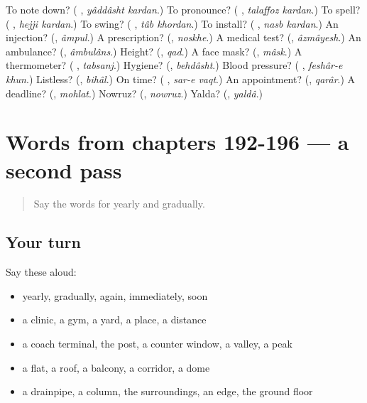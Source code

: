 \begin{tcolorbox}[breakable,colback=teal!4,colframe=teal!35!black,title={Before you move on}]
To note down? (\textbf{ }, \emph{yâddâsht kardan}.) To pronounce? (\textbf{ }, \emph{talaffoz kardan}.) To spell? (\textbf{ }, \emph{hejji kardan}.) To swing? (\textbf{ }, \emph{tâb khordan}.) To install? (\textbf{ }, \emph{nasb kardan}.) An injection? (\textbf{}, \emph{âmpul}.) A prescription? (\textbf{}, \emph{noskhe}.) A medical test? (\textbf{}, \emph{âzmâyesh}.) An ambulance? (\textbf{}, \emph{âmbulâns}.) Height? (\textbf{}, \emph{qad}.) A face mask? (\textbf{}, \emph{mâsk}.) A thermometer? (\textbf{ }, \emph{tabsanj}.) Hygiene? (\textbf{}, \emph{behdâsht}.) Blood pressure? (\textbf{ }, \emph{feshâr-e khun}.) Listless? (\textbf{}, \emph{bihâl}.) On time? (\textbf{ }, \emph{sar-e vaqt}.) An appointment? (\textbf{}, \emph{qarâr}.) A deadline? (\textbf{}, \emph{mohlat}.) Nowruz? (\textbf{}, \emph{nowruz}.) Yalda? (\textbf{}, \emph{yaldâ}.)
\end{tcolorbox}
\section[(dialogue)]{Words from chapters 192-196 — a second pass}

\label{lesson:FA-R196-second-pass-words-from-chapters-192-196}



\begin{quote}
Say the words for yearly and gradually.
\end{quote}

\subsection*{Your turn}
Say these aloud:

\begin{itemize}
\raggedright
  \item yearly, gradually, again, immediately, soon
  \item a clinic, a gym, a yard, a place, a distance
  \item a coach terminal, the post, a counter window, a valley, a peak
  \item a flat, a roof, a balcony, a corridor, a dome
  \item a drainpipe, a column, the surroundings, an edge, the ground floor
\end{itemize}

